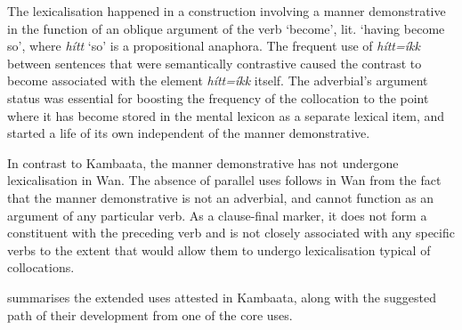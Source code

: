 \documentclass[output=paper,colorlinks,citecolor=brown]{langscibook}
\begin{document}
The lexicalisation happened in a construction involving a manner demonstrative in the function of an oblique argument of the verb ‘become’, lit. ‘having become so’, where \textit{hítt} ‘so’ is a propositional anaphora. The frequent use of \textit{hítt=íkk} between sentences that were semantically contrastive caused the contrast to become associated with the element \textit{hítt=íkk} itself. The adverbial’s argument status was essential for boosting the frequency of the collocation to the point where it has become stored in the mental lexicon as a separate lexical item, and started a life of its own independent of the manner demonstrative.

In contrast to Kambaata, the manner demonstrative has not undergone lexicalisation in Wan. The absence of parallel uses follows in Wan from the fact that the manner demonstrative is not an adverbial, and cannot function as an argument of any particular verb. As a clause-final marker, it does not form a constituent with the preceding verb and is not closely associated with any specific verbs to the extent that would allow them to undergo lexicalisation typical of collocations.

 summarises the extended uses attested in Kambaata, along with the suggested path of their development from one of the core uses.



\end{document}
